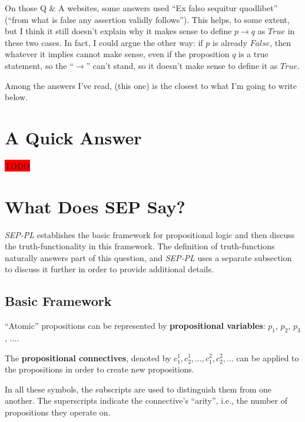 \documentclass[12pt, letterpaper]{article}
\begin{document}
On those Q \& A websites, some answers used ``Ex falso sequitur quodlibet''
(``from what is false any assertion validly follows''). This helps, to some
extent, but I think it still doesn't explain why it makes sense to define $p
\rightarrow q$ as $True$ in these two cases. In fact, I could argue the other way:
if $p$ is already $False$, then whatever it implies cannot make sense, even if
the proposition $q$ is a true statement, so the ``$\rightarrow$'' can't stand,
so it doesn't make sense to define it as $True$.

Among the answers I've read, \href{https://math.stackexchange.com/a/70739/665777}(this one)
is the closest to what I'm going to write below.

\section{A Quick Answer}

\colorbox{red}{TODO}

\section{What Does SEP Say?}

\textit{SEP-PL} establishes the basic framework for propositional logic and
then discuss the truth-functionality in this framework. The definition of
truth-functions naturally answers part of this question, and \textit{SEP-PL}
uses a separate subsection to discuss it further in order to provide additional
details.

\subsection{Basic Framework}

``Atomic'' propositions can be represented by \textbf{propositional variables}:
$p_1$, $p_2$, $p_3$, $\ldots$.

The \textbf{propositional connectives}, denoted by $c_1^1, c_2^1, \ldots, c_1^2,
c_2^2, \ldots$ can be applied to the propositions in order to create new
propositions.

In all these symbols, the subscripts are used to distinguish them from one
another. The superscripts indicate the connective's ``arity'', i.e., the number
of propositions they operate on.
\end{document}
